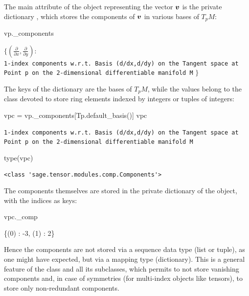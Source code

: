 The main attribute of the object  representing the vector $\bm{v}$ is the
private dictionary , which stores the components of $\bm{v}$ in various bases of $T_p M$:
\begin{NBin}
vp._components
\end{NBin}
\begin{NBout}
$\displaystyle
\bigg\{\left(\frac{\partial}{\partial x },\frac{\partial}{\partial y }\right) :$\\
\texttt{1-index components w.r.t.~Basis (d/dx,d/dy) on the Tangent space at Point p on the 2-dimensional differentiable manifold M}
$\bigg\}$
\end{NBout}
The keys of the dictionary  are the bases of $T_p M$, while the values belong to the class  devoted to store ring elements indexed by integers or tuples of integers:
\begin{NBin}
vpc = vp._components[Tp.default_basis()]
vpc
\end{NBin}
\begin{NBout}
\texttt{1-index components w.r.t.~Basis (d/dx,d/dy) on the Tangent space at Point p
on the 2-dimensional differentiable manifold M}
\end{NBout}
\begin{NBin}
type(vpc)
\end{NBin}
\begin{NBout}
\begin{verbatim}
<class 'sage.tensor.modules.comp.Components'>
\end{verbatim}
\end{NBout}
The components themselves are stored in the private dictionary  of the  object, with the indices as keys:
\begin{NBin}
vpc._comp
\end{NBin}
\begin{NBoutM}
\left\{\left(0\right) : -3, \left(1\right) : 2\right\}
\end{NBoutM}
Hence the components are not stored via a sequence data type (list or tuple), as
one might have expected, but via a mapping type (dictionary). This is a general
feature of the class  and all its subclasses, which permits
to not store vanishing components and, in case of symmetries (for multi-index
objects like tensors), to store only non-redundant components.


